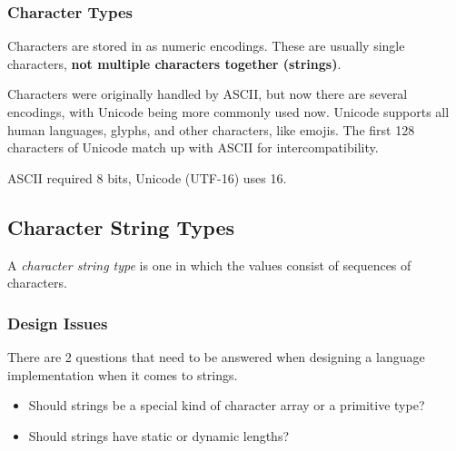 \subsubsection{Character Types}\label{subsubsec:Character_Primitive_Data_Types}
Characters are stored in  as numeric encodings.
These are usually single characters, \textbf{not multiple characters together (strings)}.

Characters were originally handled by ASCII, but now there are several encodings, with Unicode being more commonly used now.
Unicode supports all human languages, glyphs, and other characters, like emojis.
The first 128 characters of Unicode match up with ASCII for intercompatibility.

ASCII required 8 bits, Unicode (UTF-16) uses 16.

\subsection{Character String Types}\label{subsec:Character_String_Types}
\begin{definition}\label{def:Character_String_Type}
  A \emph{character string type} is one in which the values consist of sequences of characters.
\end{definition}

\subsubsection{Design Issues}\label{subsubsec:Character_String_Types_Design_Issues}
There are 2 questions that need to be answered when designing a language implementation when it comes to strings.
\begin{itemize}[noitemsep]
\item Should strings be a special kind of character array or a primitive type?
\item Should strings have static or dynamic lengths?
\end{itemize}

